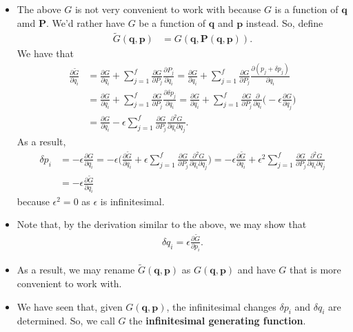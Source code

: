 \documentclass[10pt]{article}
\newcommand{\ve}[1]{\mathbf{#1}}
\begin{document}
\begin{itemize}
    \item The above $G$ is not very convenient to work with because $G$ is a function of $\ve{q}$ amd $\ve{P}$. We'd rather have $G$ be a function of $\ve{q}$ and $\ve{p}$ instead. So, define
    \begin{align*}
      \widetilde{G}(\ve{q},\ve{p}) &= G(\ve{q}, \ve{P}(\ve{q},\ve{p})).
    \end{align*}
    We have that
    \begin{align*}
      \frac{\partial\widetilde{G}}{\partial q_i}
      &= \frac{\partial G}{\partial q_i} + \sum_{j=1}^f \frac{\partial G}{\partial P_j} \frac{\partial P_j}{\partial q_i}
      = \frac{\partial G}{\partial q_i} + \sum_{j=1}^f \frac{\partial G}{\partial P_j} \frac{\partial (p_j + \delta p_j)}{\partial q_i}\\
      &= \frac{\partial G}{\partial q_i} + \sum_{j=1}^f \frac{\partial G}{\partial P_j} \frac{\partial \delta p_j}{\partial q_i}
      = \frac{\partial G}{\partial q_i} + \sum_{j=1}^f \frac{\partial G}{\partial P_j} \frac{\partial}{\partial q_i}\bigg(-\epsilon \frac{\partial G}{\partial q_j} \bigg) \\
      &= \frac{\partial G}{\partial q_i} - \epsilon \sum_{j=1}^f \frac{\partial G}{\partial P_j} \frac{\partial^2 G}{\partial q_i \partial q_j}.
    \end{align*}
    As a result,
    \begin{align*}
      \delta p_i 
      &= -\epsilon \frac{\partial G}{\partial q_i}
      = -\epsilon \bigg( \frac{\partial \widetilde{G}}{\partial q_i} + \epsilon  \sum_{j=1}^f \frac{\partial G}{\partial P_j} \frac{\partial^2 G}{\partial q_i \partial q_j}  \bigg)
      = -\epsilon \frac{\partial \widetilde{G}}{\partial q_i} + \epsilon^2  \sum_{j=1}^f \frac{\partial G}{\partial P_j} \frac{\partial^2 G}{\partial q_i \partial q_j} \\
      &= -\epsilon \frac{\partial \widetilde{G}}{\partial q_i}
    \end{align*}
    because $\epsilon^2 = 0$ as $\epsilon$ is infinitesimal.

    \item Note that, by the derivation similar to the above, we may show that
    \begin{align*}
      \delta q_i = \epsilon \frac{\partial \widetilde{G}}{\partial p_i}.
    \end{align*}

    \item As a result, we may rename $\tilde{G}(\ve{q},\ve{p})$ as $G(\ve{q},\ve{p})$ and have $G$ that is more convenient to work with.

    \item We have seen that, given $G(\ve{q}, \ve{p})$, the infinitesimal changes $\delta p_i$ and $\delta q_i$ are determined. So, we call $G$ the {\bf infinitesimal generating function}.
  \end{itemize}
\end{document}
